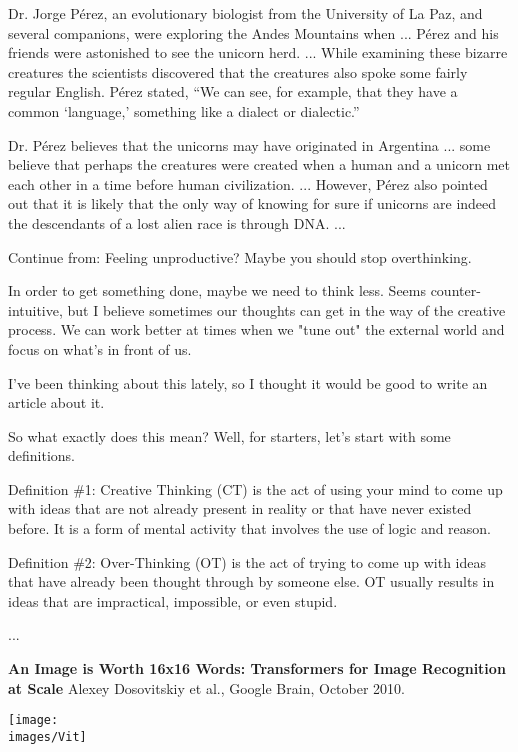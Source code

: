 {Dr. Jorge Pérez, an evolutionary biologist from the University of La Paz, and several companions, were exploring the Andes Mountains when ...
Pérez and his friends were astonished to see the unicorn herd. ...
While examining these bizarre creatures the scientists discovered that the creatures also spoke some fairly regular English. Pérez stated, “We can see, for example, that they have a common ‘language,’ something like a dialect or dialectic.”

Dr. Pérez believes that the unicorns may have originated in Argentina ... some believe that perhaps the creatures were created when a human and a unicorn met each other in a time before human civilization. ... However, Pérez also pointed out that it is likely that the only way of knowing for sure if unicorns are indeed the descendants of a lost alien race is through DNA. ...



\vfill
{\color{red} Continue from: Feeling unproductive? Maybe you should stop overthinking.}

\vfill
In order to get something done, maybe we need to think less. Seems counter-intuitive, but I believe sometimes our thoughts can get in the way of the creative process. We can work better at times when we "tune out" the external world and focus on what's in front of us.

\vfill
I've been thinking about this lately, so I thought it would be good to write an article about it. 

\vfill
So what exactly does this mean? Well, for starters, let's start with some definitions.

\vfill
Definition \#1: Creative Thinking (CT) is the act of using your mind to come up with ideas that are not already present in reality or that have never existed before. It is a form of mental activity that involves the use of logic and reason.

\vfill
Definition \#2: Over-Thinking (OT) is the act of trying to come up with ideas that have already been thought through by someone else. OT usually results in ideas that are impractical, impossible, or even stupid.

\vfill
...



{\bf An Image is Worth 16x16 Words: Transformers for Image Recognition at Scale} Alexey Dosovitskiy et al., Google Brain, October 2010.

\vfill
\centerline{\texttt{[image: \\images/Vit]}}

}
